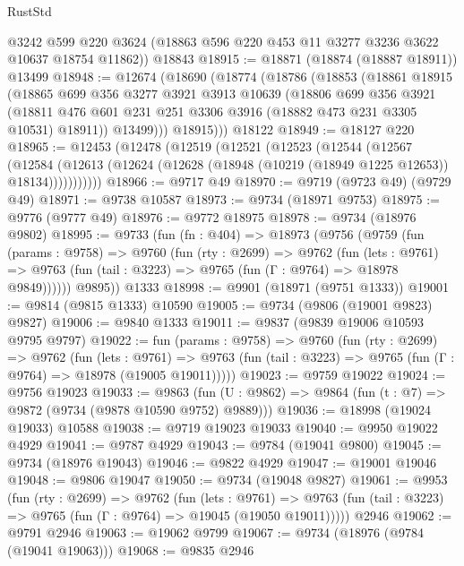 \begin{lexlean}{RustStd}
\begin{coremodule}
      @3242
      @599
      @220
      @3624
      (@18863 @596 @220 @453 @11 @3277 @3236 @3622 @10637 @18754 @11862))
    @18843
@18915 := @18871 (@18874 (@18887 @18911)) @13499
@18948 := @12674
    (@18690
      (@18774
        (@18786
          (@18853
            (@18861
              @18915
              (@18865
                @699
                @356
                @3277
                @3921
                @3913
                @10639
                (@18806
                  @699
                  @356
                  @3921
                  (@18811 @476 @601 @231 @251 @3306 @3916 (@18882 @473 @231 @3305 @10531) @18911))
                @13499)))
          @18915)))
    @18122
@18949 := @18127 @220
@18965 := @12453
    (@12478
      (@12519
        (@12521
          (@12523
            (@12544
              (@12567
                (@12584
                  (@12613 (@12624 (@12628 (@18948 (@10219 (@18949 @1225 @12653)) @18134)))))))))))
@18966 := @9717 @49
@18970 := @9719 (@9723 @49) (@9729 @49)
@18971 := @9738 @10587
@18973 := @9734 (@18971 @9753)
@18975 := @9776 (@9777 @49)
@18976 := @9772 @18975
@18978 := @9734 (@18976 @9802)
@18995 := @9733
    (fun (fn : @404) =>
    @18973
      (@9756
        (@9759
          (fun (params : @9758) =>
          @9760
            (fun (rty : @2699) =>
            @9762
              (fun (lets : @9761) =>
              @9763 (fun (tail : @3223) => @9765 (fun (Γ : @9764) => @18978 @9849))))))
        @9895))
    @1333
@18998 := @9901 (@18971 (@9751 @1333))
@19001 := @9814 (@9815 @1333) @10590
@19005 := @9734 (@9806 (@19001 @9823) @9827)
@19006 := @9840 @1333
@19011 := @9837 (@9839 @19006 @10593 @9795 @9797)
@19022 := fun (params : @9758) =>
  @9760
    (fun (rty : @2699) =>
    @9762
      (fun (lets : @9761) =>
      @9763 (fun (tail : @3223) => @9765 (fun (Γ : @9764) => @18978 (@19005 @19011)))))
@19023 := @9759 @19022
@19024 := @9756 @19023
@19033 := @9863
    (fun (U : @9862) => @9864 (fun (t : @7) => @9872 (@9734 (@9878 @10590 @9752) @9889)))
@19036 := @18998 (@19024 @19033) @10588
@19038 := @9719 @19023 @19033
@19040 := @9950 @19022 @4929
@19041 := @9787 @4929
@19043 := @9784 (@19041 @9800)
@19045 := @9734 (@18976 @19043)
@19046 := @9822 @4929
@19047 := @19001 @19046
@19048 := @9806 @19047
@19050 := @9734 (@19048 @9827)
@19061 := @9953
    (fun (rty : @2699) =>
    @9762
      (fun (lets : @9761) =>
      @9763 (fun (tail : @3223) => @9765 (fun (Γ : @9764) => @19045 (@19050 @19011)))))
    @2946
@19062 := @9791 @2946
@19063 := @19062 @9799
@19067 := @9734 (@18976 (@9784 (@19041 @19063)))
@19068 := @9835 @2946

\end{coremodule}
\end{lexlean}
